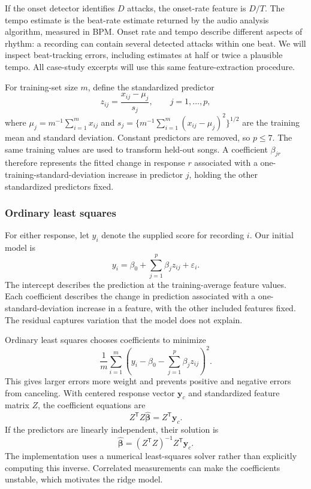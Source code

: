 If the onset detector identifies $D$ attacks, the onset-rate feature is $D/T$. The tempo estimate is the beat-rate estimate returned by the audio analysis algorithm, measured in BPM. Onset rate and tempo describe different aspects of rhythm: a recording can contain several detected attacks within one beat. We will inspect beat-tracking errors, including estimates at half or twice a plausible tempo. All case-study excerpts will use this same feature-extraction procedure.

For training-set size $m$, define the standardized predictor
\begin{equation}
 z_{ij}=\frac{x_{ij}-\mu_j}{s_j},
 \qquad j=1,\ldots,p,
\end{equation}
where $\mu_j=m^{-1}\sum_{i=1}^m x_{ij}$ and $s_j=\{m^{-1}\sum_{i=1}^m(x_{ij}-\mu_j)^2\}^{1/2}$ are the training mean and standard deviation. Constant predictors are removed, so $p\leq7$. The same training values are used to transform held-out songs. A coefficient $\beta_{jr}$ therefore represents the fitted change in response $r$ associated with a one-training-standard-deviation increase in predictor $j$, holding the other standardized predictors fixed.

\subsubsection{Ordinary least squares}

For either response, let $y_i$ denote the supplied score for recording $i$. Our initial model is
\begin{equation}
y_i=\beta_0+\sum_{j=1}^{p}\beta_jz_{ij}+\varepsilon_i.
\end{equation}
The intercept describes the prediction at the training-average feature values. Each coefficient describes the change in prediction associated with a one-standard-deviation increase in a feature, with the other included features fixed. The residual captures variation that the model does not explain.

Ordinary least squares chooses coefficients to minimize
\begin{equation}
\frac{1}{m}\sum_{i=1}^{m}
\left(y_i-\beta_0-\sum_{j=1}^{p}\beta_jz_{ij}\right)^2.
\end{equation}
This gives larger errors more weight and prevents positive and negative errors from canceling. With centered response vector $\bm y_c$ and standardized feature matrix $Z$, the coefficient equations are
\[
Z^{\mathsf T}Z\widehat{\bm\beta}=Z^{\mathsf T}\bm y_c.
\]
If the predictors are linearly independent, their solution is
\[
\widehat{\bm\beta}=(Z^{\mathsf T}Z)^{-1}Z^{\mathsf T}\bm y_c.
\]
The implementation uses a numerical least-squares solver rather than explicitly computing this inverse. Correlated measurements can make the coefficients unstable, which motivates the ridge model.


